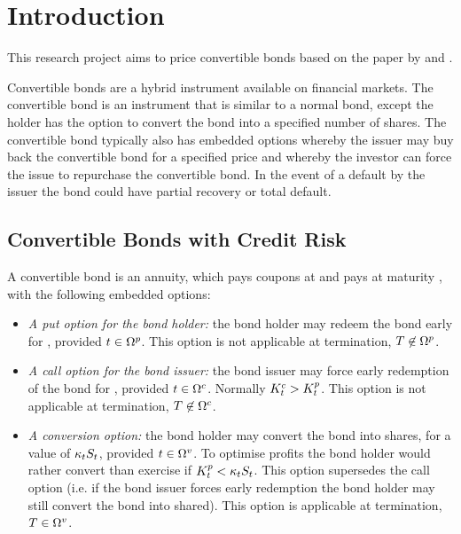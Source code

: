 \documentclass[a4paper,11pt,oneside]{report}
\newcommand{\setlinespacing}[1]
           {\renewcommand{\baselinestretch}{#1}\small\normalsize}
\theoremstyle{plain}
\theoremstyle{definition}
\begin{document}

\setlinespacing{1}
\tableofcontents
\listoffigures
\listoftables
\clearpage
\setlinespacing{1.20}
\setcounter{page}{1}


\chapter{Introduction}
This research project aims to price convertible bonds based on the paper by \citet{AFV03} and \citet{MK12}.

Convertible bonds are a hybrid instrument available on financial markets.  The convertible bond is an instrument that is similar to a normal bond, except the holder has the option to convert the bond into a specified number of shares.  The convertible bond typically also has embedded options whereby the issuer may buy back the convertible bond for a specified price and whereby the investor can force the issue to repurchase the convertible bond.  In the event of a default by the issuer the bond could have partial recovery or total default.


\section{Convertible Bonds with Credit Risk}
A convertible bond is an annuity, which pays coupons \C at \ti and pays \R at maturity \T, with the following embedded options:
\begin{itemize}
 \item \emph{A put option for the bond holder:} the bond holder may redeem the bond early for \Kp, provided $t \in \Omega^{p}$.  This option is not applicable at termination, $T \not\in \Omega^{p}$.
 \item \emph{A call option for the bond issuer:} the bond issuer may force early redemption of the bond for \Kc, provided $t \in \Omega^{c}$.  Normally $K^{c}_t > K^{p}_t$.  This option is not applicable at termination, $T \not\in \Omega^{c}$.
 \item \emph{A conversion option:} the bond holder may convert the bond into \Kv shares, for a value of $\kappa_tS_t$, provided $t \in \Omega^{v}$.  To optimise profits the bond holder would rather convert than exercise if $K^{p}_t < \kappa_tS_t$.  This option supersedes the call option (i.e. if the bond issuer forces early redemption the bond holder may still convert the bond into shared).  This option is applicable at termination, $T \in \Omega^{v}$.
\end{itemize}
\end{document}
